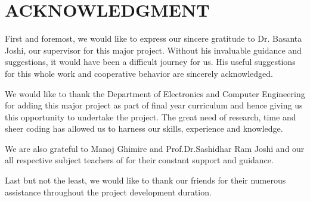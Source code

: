 \newpage
\section*{ACKNOWLEDGMENT}

First and foremost, we would like to express our sincere gratitude to Dr. Basanta Joshi, our supervisor for this major project. Without his
invaluable guidance and suggestions, it would have been a difficult journey for us. His useful suggestions for this whole work and cooperative
behavior are sincerely acknowledged.
\par We would like to thank the Department of Electronics and Computer Engineering for adding this major project as part of final year curriculum
and hence giving us this opportunity to undertake the project. The great need of research, time and sheer coding has allowed us to harness our
skills, experience and knowledge. 
\par We are also grateful to Manoj Ghimire and Prof.Dr.Sashidhar Ram Joshi and our all  respective subject teachers of for their constant support
and guidance.
\par Last but not the least, we would like to thank our friends for their numerous assistance throughout the project development duration.\\

